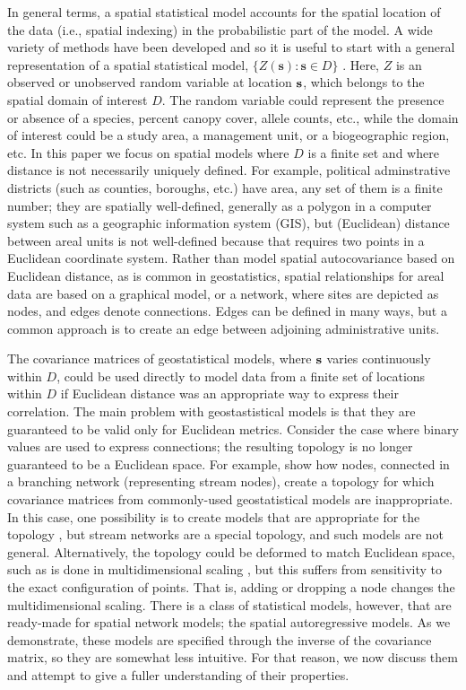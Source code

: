 \documentclass[11pt, titlepage]{article}\usepackage[]{graphicx}\usepackage[]{color}
\begin{document}
In general terms, a spatial statistical model accounts for the spatial location of the data (i.e., spatial indexing) in the probabilistic part of the model. A wide variety of methods have been developed and so it is useful to start with a general representation of a spatial statistical model, $\{Z(\mathbf{s}):\mathbf{s}\in D\}$ \citep[][pg. 8]{Cres:stat:1993}. Here, $Z$ is an observed or unobserved random variable at location $\mathbf{s}$, which belongs to the spatial domain of interest $D$. The random variable could represent the presence or absence of a species, percent canopy cover, allele counts, etc., while the domain of interest could be a study area, a management unit, or a biogeographic region, etc. In this paper we focus on spatial models where $D$ is a finite set and where distance is not necessarily uniquely defined.  For example, political adminstrative districts (such as counties, boroughs, etc.) have area, any set of them is a finite number; they are spatially well-defined, generally as a polygon in a computer system such as a geographic information system (GIS), but (Euclidean) distance between areal units is not well-defined because that requires two points in a Euclidean coordinate system.  Rather than model spatial autocovariance based on Euclidean distance, as is common in geostatistics, spatial relationships for areal data are based on a graphical model, or a network, where sites are depicted as nodes, and edges denote connections.  Edges can be defined in many ways, but a common approach is to create an edge between adjoining administrative units.

The covariance matrices of geostatistical models, where $\mathbf{s}$ varies continuously within $D$, could be used directly to model data from a finite set of locations within $D$ if Euclidean distance was an appropriate way to express their correlation. The main problem with geostastistical models is that they are guaranteed to be valid only for Euclidean metrics.  Consider the case where binary values are used to express connections; the resulting topology is no longer guaranteed to be a Euclidean space.  For example, \citet{Ver:Pete:Theo:spat:2006} show how nodes, connected in a branching network (representing stream nodes), create a topology for which covariance matrices from commonly-used geostatistical models are inappropriate.  In this case, one possibility is to create models that are appropriate for the topology \citep[e.g.,][]{Ver:Pete:Move:2010}, but stream networks are a special topology, and such models are not general.  Alternatively, the topology could be deformed to match Euclidean space, such as is done in multidimensional scaling \citep{Curr:NonE:2006}, but this suffers from sensitivity to the exact configuration of points.  That is, adding or dropping a node changes the multidimensional scaling. There is a class of statistical models, however, that are ready-made for spatial network models; the spatial autoregressive models. As we demonstrate, these models are specified through the inverse of the covariance matrix, so they are somewhat less intuitive.  For that reason, we now discuss them and attempt to give a fuller understanding of their properties.
\end{document}
